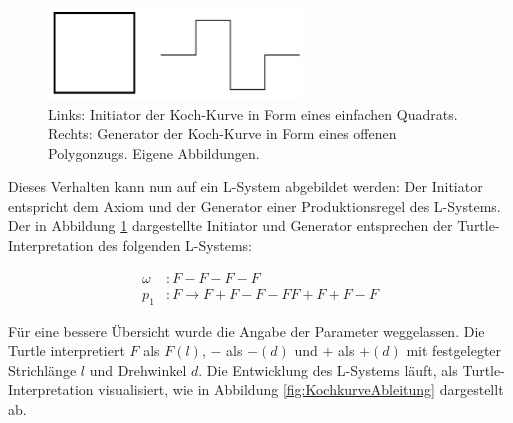 \begin{figure} [hbtp]
	\centering
	\includegraphics[width=0.6\textwidth]{images/InitiatorGenerator.png}
	\caption{Links: Initiator der Koch-Kurve in Form eines einfachen Quadrats. Rechts: Generator der Koch-Kurve in Form eines offenen Polygonzugs. Eigene Abbildungen.}
	\label{fig:InitiatorGenerator}
\end{figure}

Dieses Verhalten kann nun auf ein L-System abgebildet werden: Der Initiator entspricht dem Axiom und der Generator einer Produktionsregel des L-Systems. Der in Abbildung \ref{fig:InitiatorGenerator} dargestellte Initiator und Generator entsprechen der Turtle-Interpretation des folgenden L-Systems:

\begin{equation}
\begin{array}{llll}
\omega & : F-F-F-F \\
p_1 & : F \rightarrow F+F-F-FF+F+F-F
\end{array}
\label{eq:ProdKochKurve}
\end{equation} 

Für eine bessere Übersicht wurde die Angabe der Parameter weggelassen. Die Turtle interpretiert $F$ als $F(l)$, $-$ als $-(d)$ und $+$ als $+(d)$ mit festgelegter Strichlänge $l$ und Drehwinkel $d$. \label{desc:TurtleWithoutParams} Die Entwicklung des L-Systems läuft, als Turtle-Interpretation visualisiert, wie in Abbildung \ref{fig:KochkurveAbleitung} dargestellt ab.

